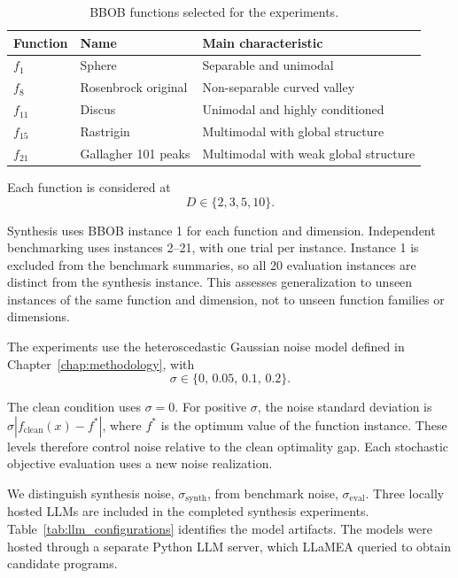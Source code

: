 \begin{table}[htbp]
    \centering
    \caption{BBOB functions selected for the experiments.}
    \label{tab:experiment_functions}
    \begin{tabular}{lll}
        \hline
        Function & Name & Main characteristic \\
        \hline
        $f_1$ & Sphere & Separable and unimodal \\
        $f_8$ & Rosenbrock original & Non-separable curved valley \\
        $f_{11}$ & Discus & Unimodal and highly conditioned \\
        $f_{15}$ & Rastrigin & Multimodal with global structure \\
        $f_{21}$ & Gallagher 101 peaks & Multimodal with weak global structure \\
        \hline
    \end{tabular}
\end{table}

Each function is considered at
\begin{equation}
    D \in \{2,3,5,10\}.
    \label{eq:experiment_dimensions}
\end{equation}

Synthesis uses BBOB instance 1 for each function and dimension.
Independent benchmarking uses instances 2--21, with one trial per
instance. Instance 1 is excluded from the benchmark summaries, so all
20 evaluation instances are distinct from the synthesis instance.
This assesses generalization to unseen instances of the same function
and dimension, not to unseen function families or dimensions.

The experiments use the heteroscedastic Gaussian noise model defined in
Chapter~\ref{chap:methodology}, with
\begin{equation}
    \sigma \in \{0,\,0.05,\,0.1,\,0.2\}.
    \label{eq:experiment_noise_levels}
\end{equation}

The clean condition uses $\sigma=0$. For positive $\sigma$, the noise
standard deviation is $\sigma|f_{\mathrm{clean}}(x)-f^*|$, where $f^*$
is the optimum value of the function instance. These levels therefore
control noise relative to the clean optimality gap. Each stochastic
objective evaluation uses a new noise realization.

We distinguish synthesis noise, $\sigma_{\mathrm{synth}}$, from
benchmark noise, $\sigma_{\mathrm{eval}}$. 
Three locally hosted LLMs are included in the completed synthesis
experiments. Table~\ref{tab:llm_configurations} identifies the model
artifacts. The models were hosted through a separate Python LLM server,
which LLaMEA queried to obtain candidate programs.

